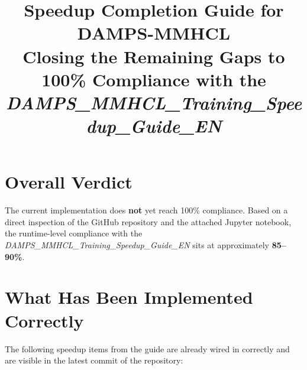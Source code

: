 \documentclass[11pt,a4paper]{article}
\title{Speedup Completion Guide for DAMPS-MMHCL\\[0.4em]
\large Closing the Remaining Gaps to 100\% Compliance with the
\textit{DAMPS\_MMHCL\_Training\_Speedup\_Guide\_EN}}
\author{}
\date{}
\begin{document}
\maketitle

\section*{Overall Verdict}
The current implementation does \textbf{not} yet reach 100\% compliance. Based on a
direct inspection of the GitHub repository and the attached Jupyter notebook, the
runtime-level compliance with the \textit{DAMPS\_MMHCL\_Training\_Speedup\_Guide\_EN}
sits at approximately \textbf{85--90\%}.

\section{What Has Been Implemented Correctly}
The following speedup items from the guide are already wired in correctly and are
visible in the latest commit of the repository:
\end{document}
